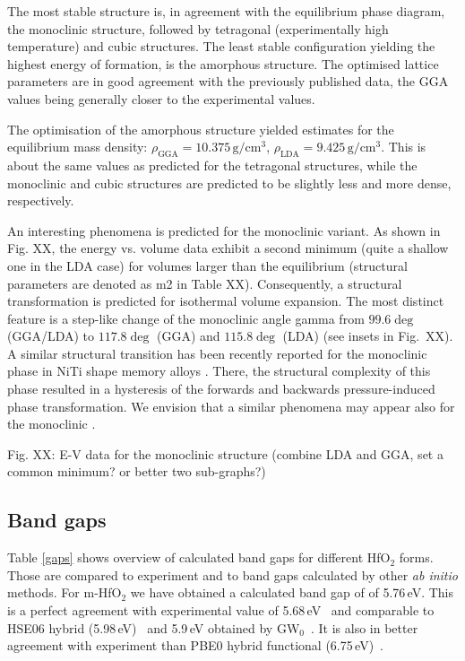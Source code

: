\documentclass[10pt,a4paper,twocolumn]{article}
\begin{document}

The most stable structure is, in agreement with the equilibrium phase diagram, the monoclinic structure, followed by tetragonal (experimentally high temperature) and cubic structures.
The least stable configuration yielding the highest energy of formation, is the amorphous structure.
The optimised lattice parameters are in good agreement with the previously published data, the GGA values being generally closer to the experimental values.

The optimisation of the amorphous structure yielded estimates for the equilibrium mass density: $\rho_{\mathrm{GGA}}=10.375\,\mathrm{g/cm^3}$, $\rho_{\mathrm{LDA}}=9.425\,\mathrm{g/cm^3}$. %
This is about the same values as predicted for the tetragonal structures, while the monoclinic and cubic structures are predicted to be slightly less and more dense, respectively.

An interesting phenomena is predicted for the monoclinic variant.
As shown in Fig. XX, the energy vs. volume data exhibit a second minimum (quite a shallow one in the LDA case) for volumes larger than the equilibrium (structural parameters are denoted as m2 in Table XX).
Consequently, a structural transformation is predicted for isothermal volume expansion.
The most distinct feature is a step-like change of the monoclinic angle gamma from $99.6\deg$ (GGA/LDA) to $117.8\deg$ (GGA) and $115.8\deg$ (LDA) (see insets in Fig.~XX).
A similar structural transition has been recently reported for the monoclinic phase in NiTi shape memory alloys \cite{Holec2011-tg}.
There, the structural complexity of this phase resulted in a hysteresis of the forwards and backwards pressure-induced phase transformation.
We envision that a similar phenomena may appear also for the monoclinic .

Fig. XX: E-V data for the monoclinic structure (combine LDA and GGA, set a common minimum? or better two sub-graphs?)


\subsection{Band gaps}

Table \ref{gaps} shows overview of calculated band gaps for different HfO$_2$ forms.
Those are compared to experiment and to band gaps calculated by other \textit{ab initio} methods.
For m-HfO$_2$ we have obtained a calculated band gap of of 5.76\,eV.
This is a perfect agreement with experimental value of 5.68\,eV~\cite{Balog1977} and comparable to HSE06 hybrid (5.98\,eV)~\cite{Komsa2010} and 5.9\,eV obtained by GW$_0$~\cite{Gruning2010}.
It is also in better agreement with experiment than PBE0 hybrid functional (6.75\,eV)~\cite{Komsa2010}.
\end{document}
